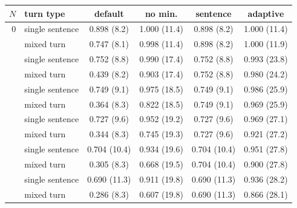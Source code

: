 \begin{tabular}{rlcccc}
\toprule
$N$ & turn type & default & no min. & sentence & adaptive \\
\midrule
0 & single sentence & 0.898 (8.2) & 1.000 (11.4) & 0.898 (8.2) & 1.000 (11.4) \\
 & mixed turn & 0.747 (8.1) & 0.998 (11.4) & 0.898 (8.2) & 1.000 (11.9) \\
\addlinespace[2pt]
25 & single sentence & 0.752 (8.8) & 0.990 (17.4) & 0.752 (8.8) & 0.993 (23.8) \\
 & mixed turn & 0.439 (8.2) & 0.903 (17.4) & 0.752 (8.8) & 0.980 (24.2) \\
\addlinespace[2pt]
50 & single sentence & 0.749 (9.1) & 0.975 (18.5) & 0.749 (9.1) & 0.986 (25.9) \\
 & mixed turn & 0.364 (8.3) & 0.822 (18.5) & 0.749 (9.1) & 0.969 (25.9) \\
\addlinespace[2pt]
100 & single sentence & 0.727 (9.6) & 0.952 (19.2) & 0.727 (9.6) & 0.969 (27.1) \\
 & mixed turn & 0.344 (8.3) & 0.745 (19.3) & 0.727 (9.6) & 0.921 (27.2) \\
\addlinespace[2pt]
200 & single sentence & 0.704 (10.4) & 0.934 (19.6) & 0.704 (10.4) & 0.951 (27.8) \\
 & mixed turn & 0.305 (8.3) & 0.668 (19.5) & 0.704 (10.4) & 0.900 (27.8) \\
\addlinespace[2pt]
350 & single sentence & 0.690 (11.3) & 0.911 (19.8) & 0.690 (11.3) & 0.936 (28.2) \\
 & mixed turn & 0.286 (8.3) & 0.607 (19.8) & 0.690 (11.3) & 0.866 (28.1) \\
\bottomrule
\end{tabular}
